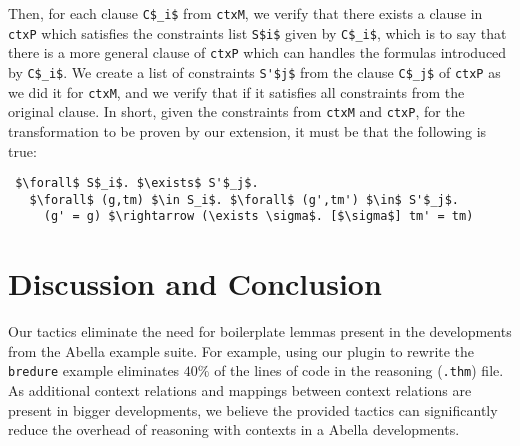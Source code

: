 \documentclass[nocopyrightspace,authoryear]{sigplanconf}
\begin{document}
Then, for each clause \lstinline|C$_i$| from \lstinline|ctxM|, we verify that there exists a clause in \lstinline|ctxP| which satisfies the constraints list \lstinline|S$i$| given by \lstinline|C$_i$|, which is to say that there is a more general clause of \lstinline|ctxP| which can handles the formulas introduced by \lstinline|C$_i$|. We create a list of constraints \lstinline|S'$j$| from the clause \lstinline|C$_j$| of \lstinline|ctxP| as we did it for \lstinline|ctxM|, and we verify that if it satisfies all constraints from the original clause. In short, given the constraints from \lstinline|ctxM| and \lstinline|ctxP|, for the transformation to be proven by our extension, it must be that the following is true:
\begin{lstlisting}
 $\forall$ S$_i$. $\exists$ S'$_j$. 
   $\forall$ (g,tm) $\in S_i$. $\forall$ (g',tm') $\in$ S'$_j$. 
     (g' = g) $\rightarrow (\exists \sigma$. [$\sigma$] tm' = tm)
\end{lstlisting}



\begin{comment}
2:
To do so, for every \lstinline|D$_i$ $\in$ D$_1$, ..., D$_p$|, we form the set 
\lstinline|S$_{i}$: { G$_k$ $\mid$ D$_i$ = G$_k$ $\wedge$ G$_k$ $\in$ G$_1$, ..., G$_m$}|. 
Then, for each such \lstinline|S$_i$| and for each clause \lstinline|C$_j$| in the original schema \lstinline|ctxM|, we unify, for each \lstinline|G$_k$ $\in$ S$_i$|, \lstinline|C$_{j,k}$| together as \lstinline|CR$_{i,j}$| , and verify that there exists a clause \lstinline|C'$_l$| in the destination schema \lstinline|ctxP| such that \lstinline|CR$_{i,j}$| matches \lstinline|C'$_{l,i}$|.
\end{comment}

\begin{comment}
1:
The $i$th context relations \lstinline|S| can be used as the $j$th projection of a context relations \lstinline|S'| if, for each clauses \lstinline|C| of \lstinline|S|, there exists a clause \lstinline|C'| of \lstinline|S'| s.t. the $i$th formula of \lstinline|C| matches the $j$th formula of \lstinline|C'|, which is to say that the $j$th projection of the schema \lstinline|S'| is more general than the $i$th projection schema \lstinline|S| .
\end{comment}


\section{Discussion and Conclusion}
Our tactics eliminate the need for boilerplate lemmas present in the developments from the Abella example suite. For example, using our plugin to rewrite the \lstinline{bredure} example eliminates $40\%$ of the lines of code in the reasoning (\lstinline{.thm}) file. As additional context relations and mappings between context relations are present in bigger developments, we believe the provided tactics can significantly reduce the overhead of reasoning with contexts in a Abella developments.
\end{document}
